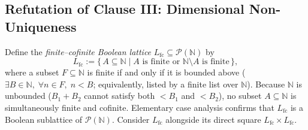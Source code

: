 \documentclass[11pt]{article}
\theoremstyle{definition}
\theoremstyle{remark}
\newcommand{\N}{\mathbb{N}}
\newcommand{\Lfc}{L_{\mathrm{fc}}}
\begin{document}
\subsection{Refutation of Clause III: Dimensional Non-Uniqueness}

Define the \emph{finite--cofinite Boolean lattice} $\Lfc \subseteq \mathcal{P}(\N)$ by
\[
  \Lfc := \bigl\{\, A \subseteq \N \;\big|\; A \text{ is finite or } \N \setminus A \text{ is finite} \,\bigr\},
\]
where a subset $F \subseteq \N$ is finite if and only if it is bounded above ($\exists B \in \N,\; \forall n \in F,\; n < B$; equivalently, listed by a finite list over $\N$). Because $\N$ is unbounded ($B_1 + B_2$ cannot satisfy both $< B_1$ and $< B_2$), no subset $A \subseteq \N$ is simultaneously finite and cofinite. Elementary case analysis confirms that $\Lfc$ is a Boolean sublattice of $\mathcal{P}(\N)$. Consider $\Lfc$ alongside its direct square $\Lfc \times \Lfc$.
\end{document}
